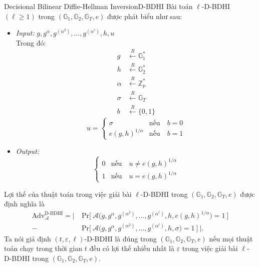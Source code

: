 \documentclass[class=report, crop=false]{standalone}
\begin{document}
		\begin{problem}{Decisional Bilinear Diffie-Hellman Inversion}{D-BDHI}
			Bài toán $\ell$-D-BDHI $(\ell \geq 1)$ trong $(\mathbb{G}_1, \mathbb{G}_2, \mathbb{G}_T, e)$ được phát biểu như sau:
			\vspace{-\baselineskip}
			\begin{itemize}[leftmargin=1.5cm, itemindent=-0.5cm]
				\item[] \textit{Input:} $g, g^\alpha, g^{(\alpha^2)}, ..., g^{(\alpha^\ell)}, h, u$ \\
				Trong đó: \vspace{-\baselineskip}
				\begin{align*}
					g 		&\xleftarrow{R} \mathbb{G}_1^* \\
					h 		&\xleftarrow{R} \mathbb{G}_2^* \\
					\alpha 	&\xleftarrow{R} \mathbb{Z}_p^* \\
					\sigma 	&\xleftarrow{R} \mathbb{G}_T \\
					b 		&\xleftarrow{R} \{ 0, 1 \}
				\end{align*}
				\[
					u = \begin{cases}
						\sigma 							&\text{nếu}\quad b = 0 \\
						e(g, h)^{1/\alpha} 	&\text{nếu}\quad b = 1
					\end{cases}
				\]
				\item[] \textit{Output:}
				\[
					\begin{cases}
						0 &\text{nếu}\quad u \neq e(g, h)^{1/\alpha} \\
						1 &\text{nếu}\quad u = e(g, h)^{1/\alpha}
					\end{cases}
				\]
			\end{itemize}
			\vspace{-\baselineskip}\par
			Lợi thế của thuật toán \algo trong việc giải bài $\ell$-D-BDHI trong $(\mathbb{G}_1, \mathbb{G}_2, \mathbb{G}_T, e)$ được định nghĩa là
			\begin{equation*}
				\begin{split}
					\text{Adv}_{\mathcal{A}}^{\text{D-BDHI}} = \Bigg|\ &\text{Pr}\bigg[ \ \mathcal{A}\Big(g, g^\alpha, g^{(\alpha^2)}, ..., g^{(\alpha^\ell)}, h, e(g, h)^{1/\alpha} \Big) = 1 \ \bigg] \\
					- &\text{Pr}\bigg[ \ \mathcal{A}\Big(g, g^\alpha, g^{(\alpha^2)}, ..., g^{(\alpha^\ell)}, h, \sigma \Big) = 1 \ \bigg]\ \Bigg|.
				\end{split}
			\end{equation*} \indent
			Ta nói giả định $(t, \varepsilon, \ell)$-D-BDHI là đúng trong $(\mathbb{G}_1, \mathbb{G}_2, \mathbb{G}_T, e)$ nếu mọi thuật toán chạy trong thời gian $t$ đều có lợi thế nhiều nhất là $\varepsilon$ trong việc giải bài $\ell$-D-BDHI trong $(\mathbb{G}_1, \mathbb{G}_2, \mathbb{G}_T, e)$.
		\end{problem}
\end{document}
